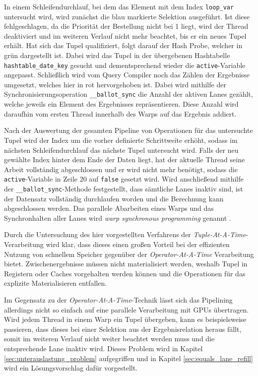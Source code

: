 In einem Schleifendurchlauf, bei dem das Element mit dem Index \texttt{loop\_var} untersucht wird, wird zunächst die blau markierte Selektion ausgeführt.
Ist diese fehlgeschlagen, da die Priorität der Bestellung nicht bei 1 liegt, wird der Thread deaktiviert und im weiteren Verlauf nicht mehr beachtet, bis er ein neues Tupel erhält.
Hat sich das Tupel qualifiziert, folgt darauf der Hash Probe, welcher in grün dargestellt ist.
Dabei wird das Tupel in der übergebenen Hashtabelle \texttt{hashtable\_date\_key} gesucht und dementsprechend wieder die \texttt{active}-Variable angepasst.
Schließlich wird vom Query Compiler noch das Zählen der Ergebnisse umgesetzt, welches hier in rot hervorgehoben ist.
Dabei wird mithilfe der Synchronisierungsoperation \texttt{\_\_ballot\_sync} die Anzahl der aktiven Lanes gezählt, welche jeweils ein Element des Ergebnisses repräsentieren.
Diese Anzahl wird daraufhin vom ersten Thread innerhalb des Warps auf das Ergebnis addiert. 

Nach der Auswertung der gesamten Pipeline von Operationen für das untersuchte Tupel wird der Index um die vorher definierte Schrittweite erhöht, sodass im nächsten Schleifendurchlauf das nächste Tupel untersucht wird.
Falls der neu gewählte Index hinter dem Ende der Daten liegt, hat der aktuelle Thread seine Arbeit vollständig abgeschlossen und er wird nicht mehr benötigt, sodass die \texttt{active}-Variable in Zeile 20 auf \texttt{false} gesetzt wird.
Wird anschließend mithilfe der \texttt{\_\_ballot\_sync}-Methode festgestellt, dass sämtliche Lanes inaktiv sind, ist der Datensatz vollständig durchlaufen worden und die Berechnung kann abgeschlossen werden.
Das parallele Abarbeiten eines Warps und das Synchronhalten aller Lanes wird \emph{warp synchronous programming} genannt \cite{Lin2018}.

Durch die Untersuchung des hier vorgestellten Verfahrens der \emph{Tuple-At-A-Time}-Ver\-ar\-bei\-tung wird klar, dass dieses einen großen Vorteil bei der effizienten Nutzung von schnellem Speicher gegenüber der \emph{Operator-At-A-Time} Verarbeitung bietet.
Zwischenergebnisse müssen nicht materialisiert werden, weshalb Tupel in Registern oder Caches vorgehalten werden können und die Operationen für das explizite Materialisieren entfallen.

Im Gegensatz zu der \emph{Operator-At-A-Time}-Technik lässt sich das Pipelining allerdings nicht so einfach auf eine parallele Verarbeitung mit GPUs übertragen.
Wird jedem Thread in einem Warp ein Tupel übergeben, kann es beispielsweise passieren, dass dieses bei einer Selektion aus der Ergebnisrelation heraus fällt, somit im weiteren Verlauf nicht weiter beachtet werden muss und die entsprechende Lane inaktiv wird.
Dieses Problem wird in Kapitel \ref{sec:unterauslastung_problem} aufgegriffen und in Kapitel \ref{sec:equals_lane_refill} wird ein Lösungsvorschlag dafür vorgestellt.